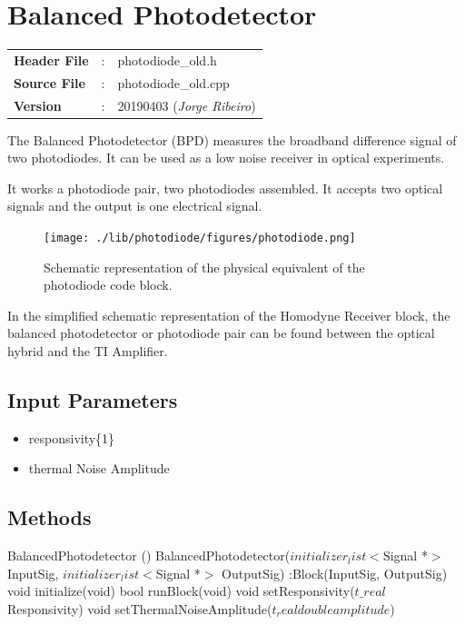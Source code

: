\clearpage

\section{Balanced Photodetector}

\begin{tcolorbox}	
	\begin{tabular}{p{2.75cm} p{0.2cm} p{10.5cm}} 	
		\textbf{Header File}   &:& photodiode\_old.h \\
		\textbf{Source File}   &:& photodiode\_old.cpp \\
        \textbf{Version}       &:& 20190403 (\emph{Jorge Ribeiro})\\
	\end{tabular}
\end{tcolorbox}


The Balanced Photodetector (BPD) measures the broadband difference signal of two photodiodes. It can be used as a low noise receiver in optical experiments.

It works a photodiode pair, two photodiodes assembled. It accepts two optical signals and the output is one electrical signal.


\begin{figure}[h]
	\centering\texttt{[image: ./lib/photodiode/figures/photodiode.png]}
	\caption{Schematic representation of the physical equivalent of the photodiode code block.}\label{photodiode}
\end{figure}

In the simplified schematic representation of the Homodyne Receiver block, the balanced photodetector or photodiode pair can be found between the optical hybrid and the TI Amplifier.

\subsection*{Input Parameters}

\begin{itemize}
	\item responsivity\{1\}
	\item thermal Noise Amplitude\
\end{itemize}

\subsection*{Methods}

BalancedPhotodetector () {}
\bigbreak
BalancedPhotodetector($initializer_list$$<$Signal *$>$ InputSig, $initializer_list$$<$Signal *$>$ OutputSig) :Block(InputSig, OutputSig) {}
\bigbreak
void initialize(void)
\bigbreak
bool runBlock(void)
\bigbreak
void setResponsivity(\texttt{$t\_real$} Responsivity)
\bigbreak
void setThermalNoiseAmplitude($t_real double amplitude$)

